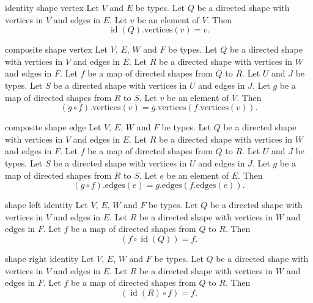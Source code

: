 \begin{cleanresult}{identity shape vertex}
Let $V$ and $E$ be types.
Let $Q$ be a directed shape with vertices in $V$ and edges in $E$.
Let $v$ be an element of $V$.
Then \[\operatorname{id}(Q).\mathrm{vertices}(v) = v.\]
\end{cleanresult}

\begin{cleanresult}{composite shape vertex}
Let $V$, $E$, $W$ and $F$ be types.
Let $Q$ be a directed shape with vertices in $V$ and edges in $E$.
Let $R$ be a directed shape with vertices in $W$ and edges in $F$.
Let $f$ be a map of directed shapes from $Q$ to $R$.
Let $U$ and $J$ be types.
Let $S$ be a directed shape with vertices in $U$ and edges in $J$.
Let $g$ be a map of directed shapes from $R$ to $S$.
Let $v$ be an element of $V$.
Then \[(g \circ f).\mathrm{vertices}(v) = g.\mathrm{vertices}(f.\mathrm{vertices}(v)).\]
\end{cleanresult}

\begin{cleanresult}{composite shape edge}
Let $V$, $E$, $W$ and $F$ be types.
Let $Q$ be a directed shape with vertices in $V$ and edges in $E$.
Let $R$ be a directed shape with vertices in $W$ and edges in $F$.
Let $f$ be a map of directed shapes from $Q$ to $R$.
Let $U$ and $J$ be types.
Let $S$ be a directed shape with vertices in $U$ and edges in $J$.
Let $g$ be a map of directed shapes from $R$ to $S$.
Let $e$ be an element of $E$.
Then \[(g \circ f).\mathrm{edges}(e) = g.\mathrm{edges}(f.\mathrm{edges}(e)).\]
\end{cleanresult}

\begin{cleanresult}{shape left identity}
Let $V$, $E$, $W$ and $F$ be types.
Let $Q$ be a directed shape with vertices in $V$ and edges in $E$.
Let $R$ be a directed shape with vertices in $W$ and edges in $F$.
Let $f$ be a map of directed shapes from $Q$ to $R$.
Then \[(f \circ \operatorname{id}(Q)) = f.\]
\end{cleanresult}

\begin{cleanresult}{shape right identity}
Let $V$, $E$, $W$ and $F$ be types.
Let $Q$ be a directed shape with vertices in $V$ and edges in $E$.
Let $R$ be a directed shape with vertices in $W$ and edges in $F$.
Let $f$ be a map of directed shapes from $Q$ to $R$.
Then \[(\operatorname{id}(R) \circ f) = f.\]
\end{cleanresult}

